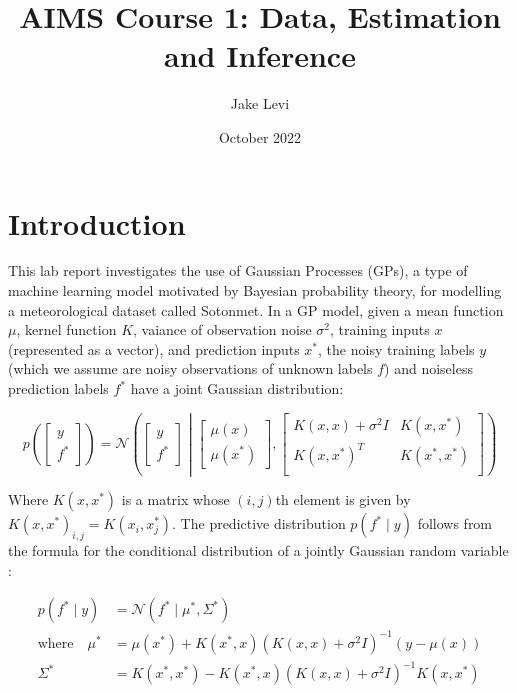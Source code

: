 \documentclass{article}
\title{AIMS Course 1: Data, Estimation and Inference}
\author{Jake Levi}
\date{October 2022}
\begin{document}
\maketitle


\section{Introduction}

This lab report investigates the use of Gaussian Processes (GPs), a type of machine learning model motivated by Bayesian probability theory, for modelling a meteorological dataset called Sotonmet. In a GP model, given a mean function $\mu$, kernel function $K$, vaiance of observation noise $\sigma^2$, training inputs $x$ (represented as a vector), and prediction inputs $x^*$, the noisy training labels $y$ (which we assume are noisy observations of unknown labels $f$) and noiseless prediction labels $f^*$ have a joint Gaussian distribution:


\begin{equation}
    p\left( \begin{bmatrix}
        y \\
        f^*
    \end{bmatrix} \right)
    = \mathcal{N} \left( \begin{bmatrix}
        y \\
        f^*
    \end{bmatrix} \middle| \begin{bmatrix}
        \mu(x) \\
        \mu(x^*)
    \end{bmatrix}, \begin{bmatrix}
        K(x, x) + \sigma^2 I & K(x, x^*) \\
        K(x, x^*)^T & K(x^*, x^*) \\
    \end{bmatrix} \right)
\end{equation}

Where $K(x, x^*)$ is a matrix whose $(i, j)$th element is given by $K(x, x^*)_{i,j} = K(x_i, x^*_j)$. The predictive distribution $p(f^* \mid y)$ follows from the formula for the conditional distribution of a jointly Gaussian random variable \cite{bishop2006pattern}:


\begin{align}
    p(f^* \mid y) &= \mathcal{N}\left(f^* \mid \mu^*, \Sigma^* \right) \label{eq:conditional distribution} \\
    \text{where} \quad \mu^* &= \mu(x^*) + K(x^*, x) \left( K(x, x) + \sigma^2 I \right)^{-1} (y - \mu(x)) \label{eq:conditional mean} \\
    \Sigma^* &= K(x^*, x^*) - K(x^*, x) \left( K(x, x) + \sigma^2 I \right) ^{-1} K(x, x^*) \label{eq:conditional variance}
\end{align}
\end{document}
